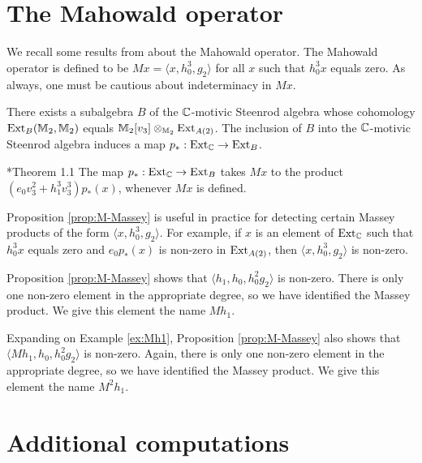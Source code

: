 \section{The Mahowald operator}
\label{subsctn:Mahowald-operator}

We recall some results from \cite{Isaksen19} about the
Mahowald operator.  The Mahowald operator is defined to be
$M x = \langle x, h_0^3, g_2 \rangle$ for all $x$ such that $h_0^3 x$
equals zero.  As always, one must be cautious about indeterminacy
in $M x$.

There exists a subalgebra $B$ of the $\mathbb{C}$-motivic Steenrod algebra whose
cohomology
$\operatorname{Ext}_B(\mathbb{M}_2, \mathbb{M}_2)$ equals $\mathbb{M}_2[v_3] \otimes_{\mathbb{M}_2} \operatorname{Ext}_{A(2)}$.
The inclusion of $B$ into the $\mathbb{C}$-motivic Steenrod algebra induces a map
$p_*: \operatorname{Ext}_{\mathbb{C}} \rightarrow \operatorname{Ext}_B$.

\begin{prop} \cite{Isaksen19}*{Theorem 1.1}
\label{prop:M-Massey}
The map $p_*: \operatorname{Ext}_{\mathbb{C}} \rightarrow \operatorname{Ext}_B$ takes $M x$ to the product
$(e_0 v_3^2 + h_1^3 v_3^3) p_*(x)$, whenever $M x$ is defined.
\end{prop}

Proposition \ref{prop:M-Massey} is useful in practice for detecting
certain Massey products of the form $\langle x, h_0^3, g_2 \rangle$.
For example, if $x$ is an element of $\operatorname{Ext}_{\mathbb{C}}$ such that
$h_0^3 x$ equals zero and $e_0 p_*(x)$ is non-zero in $\operatorname{Ext}_{A(2)}$,
then $\langle x, h_0^3, g_2 \rangle$ is non-zero.

\begin{ex}
\label{ex:Mh1}
Proposition \ref{prop:M-Massey} shows that
$\langle h_1, h_0, h_0^2 g_2 \rangle$ is non-zero.  There is
only one non-zero element in the appropriate degree, so we have
identified the Massey product.  We give this element the name
$M h_1$.
\end{ex}

\begin{ex}
\label{ex:M^2h1}
Expanding on Example \ref{ex:Mh1}, 
Proposition \ref{prop:M-Massey} also shows that 
$\langle M h_1, h_0, h_0^2 g_2 \rangle$ is non-zero.
Again, there is only one non-zero element in the appropriate
degree, so we have identified the Massey product.  We give this
element the name $M^2 h_1$.
\end{ex}

\section{Additional computations}

